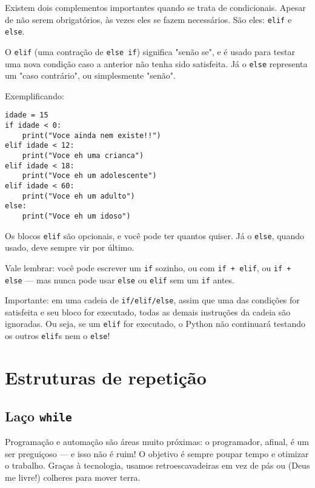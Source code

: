 \documentclass[12pt]{book}
\begin{document}
	Existem dois complementos importantes quando se trata de condicionais. Apesar de não serem obrigatórios, às vezes eles se fazem necessários. São eles: \verb*|elif| e \verb*|else|.
	
	O \verb*|elif| (uma contração de \texttt{else if}) significa "senão se", e é usado para testar uma nova condição caso a anterior não tenha sido satisfeita. Já o \verb*|else| representa um "caso contrário", ou simplesmente "senão".
	
	Exemplificando:
	
	\begin{lstlisting}[caption={Condicionais aninhadas}]
idade = 15
if idade < 0:
	print("Voce ainda nem existe!!")
elif idade < 12:
	print("Voce eh uma crianca")
elif idade < 18:
	print("Voce eh um adolescente")
elif idade < 60:
	print("Voce eh um adulto")
else:
	print("Voce eh um idoso")\end{lstlisting}
	
	\begin{tcolorbox}[colback=gray!10, colframe=black, title={\large\bfseries Observação}]
		Os blocos \verb*|elif| são opcionais, e você pode ter quantos quiser. Já o \verb*|else|, quando usado, deve sempre vir por último.
		
		Vale lembrar: você pode escrever um \verb*|if| sozinho, ou com \texttt{if + elif}, ou \texttt{if + else} — mas nunca pode usar \verb*|else| ou \verb*|elif| sem um \verb*|if| antes. \newline
		
		Importante: em uma cadeia de \verb*|if/elif/else|, assim que uma das condições for satisfeita e seu bloco for executado, todas as demais instruções da cadeia são ignoradas. Ou seja, se um \verb*|elif| for executado, o Python não continuará testando os outros \verb*|elif|s nem o \verb*|else|!
	\end{tcolorbox}
	
	\chapter{Estruturas de repetição}
	
	\section{Laço \texttt{while}}
	
	Programação e automação são áreas muito próximas: o programador, afinal, é um ser preguiçoso — e isso não é ruim! O objetivo é sempre poupar tempo e otimizar o trabalho. Graças à tecnologia, usamos retroescavadeiras em vez de pás ou (Deus me livre!) colheres para mover terra.
	
\end{document}
